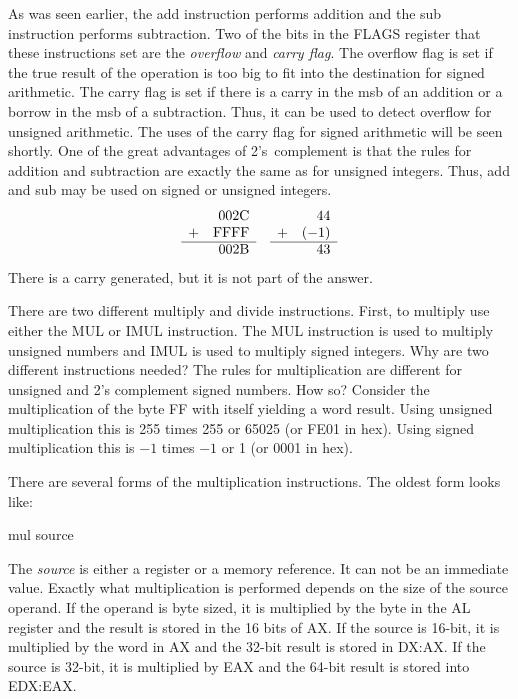 As was seen earlier, the {\code add} instruction performs addition and
the {\code sub} instruction performs subtraction. Two of the bits in
the FLAGS register that these instructions set are the \emph{overflow}
and \emph{carry flag}. The overflow flag is set if the true result of
the operation is too big to fit into the destination for signed
arithmetic. The carry flag is set if there is a carry in the msb of an
addition or a borrow in the msb of a subtraction. Thus, it can be used
to detect overflow for unsigned arithmetic. The uses of the carry flag
for signed arithmetic will be seen shortly. One of the great
advantages of 2's~complement is that the rules for addition and
subtraction are exactly the same as for unsigned integers. Thus,
{\code add} and {\code sub} may be used on signed or unsigned
integers.
\[
\begin{array}{rrcrr}
 & 002\mathrm{C} & & & 44\\
+& \mathrm{FFFF} & &+&(-1)\\ \cline{1-2} \cline{4-5}
 & 002\mathrm{B} & & & 43
\end{array}
\]
There is a carry generated, but it is not part of the answer.

There are two different multiply and divide instructions. First, to
multiply use either the {\code MUL} or {\code IMUL} instruction. The
{\code MUL} instruction is used to multiply unsigned numbers and
{\code IMUL} is used to multiply signed integers. Why are two
different instructions needed? The rules for multiplication are
different for unsigned and 2's complement signed numbers. How so?
Consider the multiplication of the byte FF with itself yielding a word
result. Using unsigned multiplication this is 255 times 255 or 65025
(or FE01 in hex). Using signed multiplication this is $-1$ times $-1$ or
1 (or 0001 in hex).

There are several forms of the multiplication instructions. The oldest
form looks like:
\begin{AsmCodeListing}[numbers=none,frame=none]
      mul   source
\end{AsmCodeListing}
The \emph{source} is either a register or a memory reference. It can not be an 
immediate value. Exactly what multiplication is performed depends on the
size of the source operand. If the operand is byte sized, it is multiplied by
the byte in the AL register and the result is stored in the 16 bits of AX.
If the source is 16-bit, it is multiplied by the word in AX and the 32-bit
result is stored in DX:AX. If the source is 32-bit, it is multiplied by EAX
and the 64-bit result is stored into EDX:EAX.

